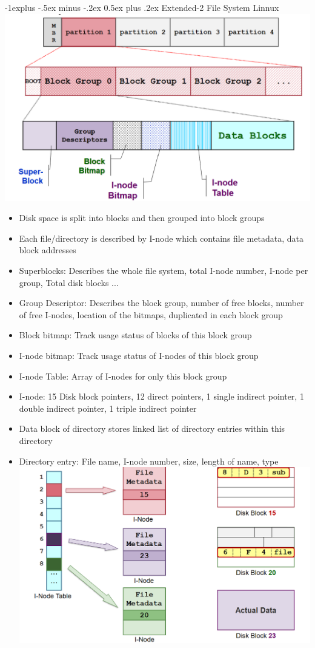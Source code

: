 \documentclass[10pt, landscape]{article}
\makeatletter
\renewcommand{\subsection}{\@startsection{subsection}{2}{0mm}%
                                {-1explus -.5ex minus -.2ex}%
                                {0.5ex plus .2ex}%
                                {\normalfont\normalsize\bfseries}}
\makeatother
\begin{document}
\begin{multicols*}{3}
\subsection{Extended-2 File System Linnux}
\includegraphics[width=\columnwidth]{Ext2 FS.png}
\begin{itemize}
	\item Disk space is split into blocks and then grouped into block groups
	\item Each file/directory is described by I-node which contains file metadata, data block addresses
	\item Superblocks: Describes the whole file system, total I-node number, I-node per group, Total disk blocks ...
	\item Group Descriptor: Describes the block group, number of free blocks, number of free I-nodes, location of the bitmaps, duplicated in each block group
	\item Block bitmap: Track usage status of blocks of this block group
	\item I-node bitmap: Track usage status of I-nodes of this block group
	\item I-node Table: Array of I-nodes for only this block group
	\item I-node: 15 Disk block pointers, 12 direct pointers, 1 single indirect pointer, 1 double indirect pointer, 1 triple indirect pointer
	\item Data block of directory stores linked list of directory entries within this directory
	\item Directory entry: File name, I-node number, size, length of name, type \includegraphics[width=\columnwidth]{Ext2 Inode.png}

\end{itemize}
\end{multicols*}
\end{document}
